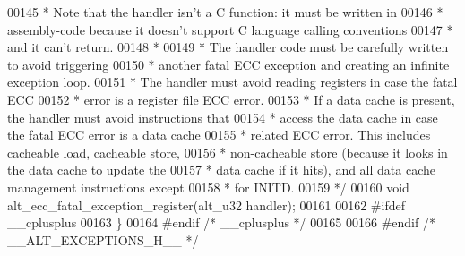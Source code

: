 \begin{DoxyCode}
00145 \textcolor{comment}{ * Note that the handler isn't a C function: it must be written in }
00146 \textcolor{comment}{ * assembly-code because it doesn't support C language calling conventions}
00147 \textcolor{comment}{ * and it can't return.}
00148 \textcolor{comment}{ *}
00149 \textcolor{comment}{ * The handler code must be carefully written to avoid triggering}
00150 \textcolor{comment}{ * another fatal ECC exception and creating an infinite exception loop.}
00151 \textcolor{comment}{ * The handler must avoid reading registers in case the fatal ECC}
00152 \textcolor{comment}{ * error is a register file ECC error.}
00153 \textcolor{comment}{ * If a data cache is present, the handler must avoid instructions that}
00154 \textcolor{comment}{ * access the data cache in case the fatal ECC error is a data cache }
00155 \textcolor{comment}{ * related ECC error. This includes cacheable load, cacheable store, }
00156 \textcolor{comment}{ * non-cacheable store (because it looks in the data cache to update the}
00157 \textcolor{comment}{ * data cache if it hits), and all data cache management instructions except}
00158 \textcolor{comment}{ * for INITD.}
00159 \textcolor{comment}{ */}
00160 \textcolor{keywordtype}{void} alt_ecc_fatal_exception_register(alt_u32 handler);
00161 
00162 \textcolor{preprocessor}{#ifdef \_\_cplusplus}
00163 \}
00164 \textcolor{preprocessor}{#endif }\textcolor{comment}{/* \_\_cplusplus */}\textcolor{preprocessor}{}
00165 
00166 \textcolor{preprocessor}{#endif }\textcolor{comment}{/* \_\_ALT\_EXCEPTIONS\_H\_\_ */}\textcolor{preprocessor}{}
\end{DoxyCode}

